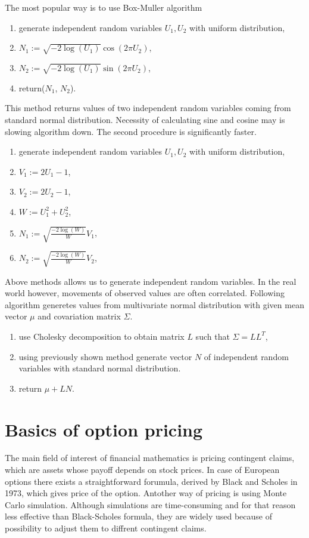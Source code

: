 \documentclass[a4paper,12pt, twoside]{article}
\theoremstyle{definition}
\theoremstyle{remark}
\begin{document}
The most popular way is to use Box-Muller algorithm
\begin{enumerate}
 \item generate independent random variables $U_1, U_2$ with uniform distribution,
 \item $N_1 := \sqrt{-2\log(U_1)} \cos(2\pi U_2)$,
 \item $N_2 := \sqrt{-2\log(U_1)} \sin(2\pi U_2)$,
 \item return($N_1$, $N_2$).
\end{enumerate}
This method returns values of two independent random variables coming from standard normal distribution. Necessity of calculating sine and cosine may is slowing algorithm down. The second procedure is significantly faster.
\begin{enumerate}
 \item generate independent random variables $U_1, U_2$ with uniform distribution,
 \item $V_1 := 2U_1-1$,
 \item $V_2 := 2U_2-1$,
 \item $W := U_1^2 + U_2^2$,
 \item $N_1 := \sqrt{\frac{-2\log(W)}{W}} V_1$,
 \item $N_2 := \sqrt{\frac{-2\log(W)}{W}} V_2$,
\end{enumerate}

Above methods allows us to generate independent random variables. In the real world however, movements of observed values are often correlated. Following algorithm generetes values from multivariate normal distribution with given mean vector $\mu$ and covariation matrix $\Sigma$. 
\begin{enumerate}
 \item use Cholesky decomposition to obtain matrix $L$ such that $\Sigma = LL^T$,
 \item using previously shown method generate vector $N$ of independent random variables with standard normal distribution.
 \item return $\mu + LN$.
\end{enumerate}


\newpage
\section{Basics of option pricing}
The main field of interest of financial mathematics is pricing contingent claims, which are assets whose payoff depends on stock prices. In case of European options there exists a straightforward forumula, derived by Black and Scholes in 1973, which gives price of the option. Antother way of pricing is using Monte Carlo simulation. Although simulations are time-consuming and for that reason less effective than Black-Scholes formula, they are widely used because of possibility to adjust them to diffrent contingent claims. 
\end{document}
